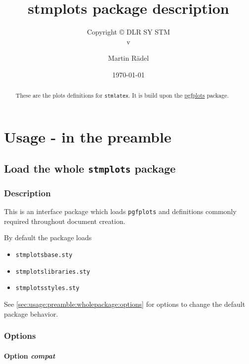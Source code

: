 \documentclass[%
  type=article,%
  layout=koma,%
  date=true,%
  hyperref=true,%
  listings=true,%
  math=true,%
  plots=false,%
]{stmtext}
\author{Martin R\"{a}del}
\title{stmplots package description}
\subtitle{Copyright \copyright{} \the\year{} DLR SY STM\\v\formatdate[versiondatestyle]{\DTMToday}}
\date{\today}
\begin{document}
\maketitle

\begin{abstract}
These are the plots definitions for \texttt{stmlatex}. It is build upon the \href{https://ctan.org/pkg/pgfplots}{pgfplots} package.
\end{abstract}

\tableofcontents

\section{Usage - in the preamble}

\subsection{Load the whole \protect\texttt{stmplots} package}

\subsubsection{Description}

This is an interface package which loads \texttt{pgfplots} and definitions commonly required throughout document creation.

By default the package loads

\begin{itemize}[noitemsep]
  \item \verb+stmplotsbase.sty+
  \item \verb+stmplotslibraries.sty+
  \item \verb+stmplotsstyles.sty+
\end{itemize}

See \autoref{sec:usage:preamble:wholepackage:options} for options to change the default package behavior.

\subsubsection{Options}
\label{sec:usage:preamble:wholepackage:options}

\paragraph{Option \protect\textit{compat}} 
\label{sec:usage:preamble:wholepackage:options:compat}
\end{document}
